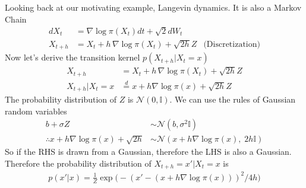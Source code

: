 \begin{eg}
	Looking back at our motivating example, Langevin dynamics. It is also a Markov Chain
	\begin{align}
		dX_t &=  \nabla \log \pi(X_t) dt + \sqrt 2 dW_t\\
		X_{t + h} & = X_t + h\, \nabla \log \pi(X_t) + \sqrt{2h} Z & \text{(Discretization)}
	\end{align}	
	Now let's derive the transition kernel $p(X_{t+h} | X_t = x)$
	\begin{align}
		X_{t + h} & = X_t + h\, \nabla \log \pi(X_t) + \sqrt{2h} Z\\
		X_{t + h} | X_t =x & \overset{d}{=} x + h \nabla \log \pi (x) +\sqrt{2 h} Z
	\end{align}
	The probability distribution of $Z$ is $\mathcal N(0, \mathbb I)$. We can use the rules of Gaussian random variables
	\begin{align}
		b + \sigma Z & \sim \mathcal N(b, \sigma^2 \mathbb I)\\
		\therefore x + h \nabla \log \pi(x) + \sqrt{2 h} & \sim \mathcal N( x + h \nabla \log \pi(x), \; 2h \mathbb I)
	\end{align} 
	So if the RHS is drawn from a Gaussian, therefore the LHS is also a Gaussian. Therefore the probability distribution of $X_{t+h} = x' | X_t=x$ is
	\begin{align}
		p(x' | x) = \frac{1}{Z} \exp \Big( -(x' - (x + h \nabla \log \pi(x)))^2 / 4 h \Big)
	\end{align}
\end{eg}



